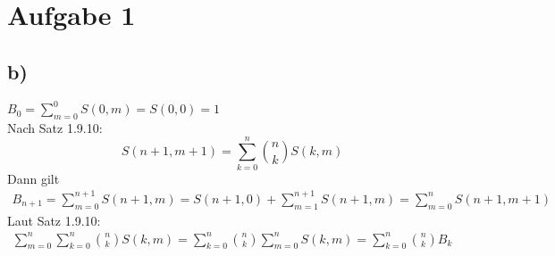 \section*{Aufgabe 1}
\subsection*{b)}
$ B_0 = \sum_{m=0}^{0}S(0,m) = S(0,0) = 1 $ \\
Nach Satz 1.9.10: $$ S(n+1,m+1) = \sum_{k=0}^{n}\binom{n}{k} S(k,m) $$
Dann gilt
\begin{align*}
  B_{n+1} = \sum_{m=0}^{n+1}S(n+1,m) = S(n+1,0) + \sum_{m = 1}^{n+1}S(n+1,m) = \sum_{m = 0}^{n}S(n+1,m+1)
\end{align*}
Laut Satz 1.9.10:
\begin{align*}
  \sum_{m = 0}^{n}\sum_{k = 0}^{n}\binom{n}{k}S(k,m) = \sum_{k = 0}^{n}\binom{n}{k}\sum_{m = 0}^{n}S(k,m) = \sum_{k = 0}^{n}\binom{n}{k}B_k
\end{align*}

